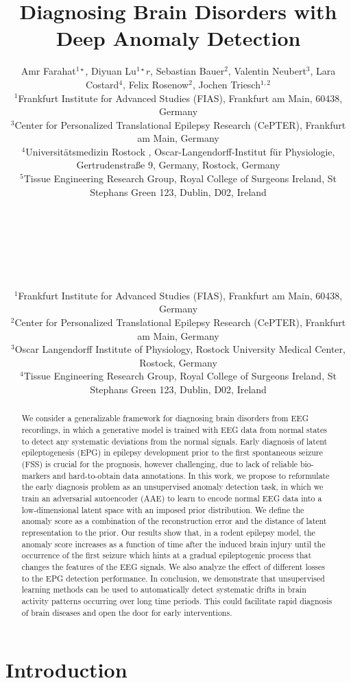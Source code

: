 \documentclass[pmlr]{jmlr}%
\title[Diagnosing Brain Disorders with Deep Anomaly Detection]{Diagnosing Brain Disorders with Deep Anomaly Detection}
\author{Amr Farahat$^{1 \star}$, Diyuan Lu$^{1 \star}r$, Sebastian Bauer$^{2}$, Valentin Neubert$^{3}$, Lara Costard$^{4}$, Felix Rosenow$^{2}$, Jochen Triesch$^{1, 2}$ \\
\small $^{1}$Frankfurt Institute for Advanced Studies (FIAS), Frankfurt am Main, 60438, Germany \\
\small $^{3}$Center for Personalized Translational Epilepsy Research (CePTER), Frankfurt am Main, Germany \\
\small $^{4}$Universitätsmedizin Rostock , Oscar-Langendorff-Institut für
Physiologie, Gertrudenstraße 9, Germany, Rostock, Germany\\
\small $^{5}$Tissue Engineering Research Group, Royal College of Surgeons Ireland, St Stephans Green 123, Dublin, D02, Ireland \\
}
\author{\Name{Amr Farahat$^{1}$}
\Email{farahat@fias.uni-frankfurt.de}\\ 
\AND
\Name{Diyuan Lu$^{1}$}
\Email{elu@fias.uni-frankfurt.de}\\ 
\AND
\Name{Sebastian Bauer$^{2}$}
\Email{Sebastian.Bauer@kgu.de}\\ 
\AND
\Name{Valentin Neubert$^{3}$}
\Email{valentin.neubert@uni-rostock.de}\\ 
\AND
\Name{Lara Sophie Costard$^{4}$}
\Email{laracostard@rcsi.com}\\ 
\AND
\Name{Felix Rosenow$^{2}$}
\Email{rosenow@med.uni-frankfurt.de}\\ 
\AND
\Name{Jochen Triesch$^{1, 2}$}
\Email{triesch@fias.uni-frankfurt.de}
\AND 
\small $^{1}$Frankfurt Institute for Advanced Studies (FIAS), Frankfurt am Main, 60438, Germany \\
\small $^{2}$Center for Personalized Translational Epilepsy Research (CePTER), Frankfurt am Main, Germany \\
\small $^{3}$Oscar Langendorff Institute of Physiology, Rostock University Medical Center, Rostock, Germany\\
\small $^{4}$Tissue Engineering Research Group, Royal College of Surgeons Ireland, St Stephans Green 123, Dublin, D02, Ireland \\
}
\begin{document}
\maketitle

\begin{abstract}
	We consider a generalizable framework for diagnosing brain disorders from EEG recordings, in which a generative model is trained with EEG data from normal states to detect any systematic deviations from the normal signals. Early diagnosis of latent epileptogenesis (EPG) in epilepsy development prior to the first spontaneous seizure (FSS) is crucial for the prognosis, however challenging, due to lack of reliable bio-markers and hard-to-obtain data annotations. In this work, we propose to reformulate the early diagnosis problem as an unsupervised anomaly detection task, in which we train an adversarial autoencoder (AAE) to learn to encode normal EEG data into a low-dimensional latent space with an imposed prior distribution. We define the anomaly score as a combination of the reconstruction error and the distance of latent representation to the prior. Our results show that, in a rodent epilepsy model, the anomaly score increases as a function of time after the induced brain injury until the occurrence of the first seizure which hints at a gradual epileptogenic process that changes the features of the EEG signals. We also analyze the effect of different losses to the EPG detection performance. In conclusion, we demonstrate that unsupervised learning methods can be used to automatically detect systematic drifts in brain activity patterns occurring over long time periods. This could facilitate rapid diagnosis of brain diseases and open the door for early interventions.
\end{abstract}

\section{Introduction}
%
%
%
\end{document}
